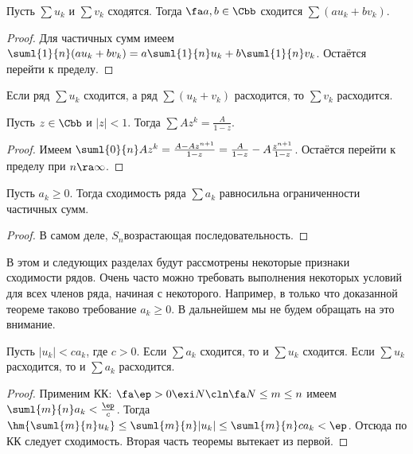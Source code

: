\documentclass[a4paper]{article}
\begin{document}
\begin{theorem}
Пусть $\sum u_k$ и $\sum v_k$ сходятся. Тогда $\fa a,b \in \Cbb$ сходится $\sum(au_k+bv_k)$.
\end{theorem}
\begin{proof}
Для частичных сумм имеем $\suml{1}{n}(au_k+bv_k)=a\suml{1}{n}u_k + b\suml{1}{n}v_k$. Остаётся перейти к пределу.
\end{proof}

\begin{note}
Если ряд $\sum u_k$ сходится, а ряд $\sum (u_k+v_k)$ расходится, то $\sum v_k$ расходится.
\end{note}

\begin{theorem}
Пусть $z \in \Cbb$ и $|z|<1$. Тогда $\sum Az^k = \frac{A}{1-z}$.
\end{theorem}
\begin{proof}
Имеем $\suml{0}{n} Az^k = \frac{A-Az^{n+1}}{1-z}=\frac{A}{1-z}-A\frac{z^{n+1}}{1-z}$. Остаётся перейти к пределу при $n\ra\infty$.
\end{proof}

\begin{theorem}
Пусть $a_k \ge 0$. Тогда сходимость ряда $\sum a_k$ равносильна ограниченности частичных сумм.
\end{theorem}
\begin{proof}
В самом деле, $S_n$\т возрастающая последовательность.
\end{proof}

\begin{note}
В этом и следующих разделах будут рассмотрены некоторые признаки сходимости рядов. Очень часто можно требовать выполнения некоторых условий
для всех членов ряда, начиная с некоторого. Например, в только что доказанной теореме таково требование $a_k \ge 0$. В дальнейшем мы не будем
обращать на это внимание.
\end{note}

\begin{theorem}
Пусть $|u_k| < ca_k$, где $c>0$. Если $\sum a_k$ сходится, то и $\sum u_k$ сходится. Если $\sum u_k$
расходится, то и $\sum a_k$ расходится.
\end{theorem}
\begin{proof}
Применим КК: $\fa \ep > 0 \exi N\cln \fa N \le m \le n$ имеем $\suml{m}{n} a_k < \frac{\ep}{c}$. Тогда
$\hm{\suml{m}{n} u_k} \le \suml{m}{n} |u_k| \le \suml{m}{n}ca_k < \ep$. Отсюда по КК следует сходимость. Вторая часть теоремы вытекает из первой.
\end{proof}
\end{document}
